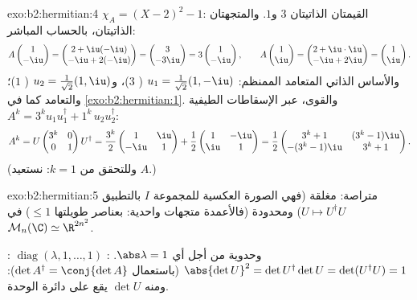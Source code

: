 \begin{solution}{exo:b2:hermitian:4}
$\chi_A = (X-2)^2 - 1$: القيمتان الذاتيتان $3$ و$1$. والمتجهتان الذاتيتان، بالحساب
المباشر:
\[
A\begin{pmatrix}1\\ -\iu\end{pmatrix}
= \begin{pmatrix} 2 + \iu(-\iu)\\ -\iu + 2(-\iu)\end{pmatrix}
= \begin{pmatrix} 3\\ -3\iu \end{pmatrix}
= 3\begin{pmatrix}1\\ -\iu\end{pmatrix},
\qquad
A\begin{pmatrix}1\\ \iu\end{pmatrix}
= \begin{pmatrix} 2 + \iu\cdot\iu\\ -\iu + 2\iu\end{pmatrix}
= \begin{pmatrix}1\\ \iu\end{pmatrix}.
\]
والأساس الذاتي المتعامد الممنظم: $u_1 = \frac{1}{\sqrt2}(1, -\iu)$
( $3$)، و$u_2 = \frac{1}{\sqrt2}(1, \iu)$ (
$1$)؛ والتعامد كما في \cref{exo:b2:hermitian:1}. والقوى، عبر
الإسقاطات الطيفية $A^k = 3^k u_1u_1^\dagger + 1^k\,
u_2u_2^\dagger$:
\[
A^k = U\begin{pmatrix} 3^k & 0\\ 0 & 1\end{pmatrix}U^\dagger
= \frac{3^k}{2}\begin{pmatrix} 1 & \iu\\ -\iu & 1\end{pmatrix}
+ \frac{1}{2}\begin{pmatrix} 1 & -\iu\\ \iu & 1\end{pmatrix}
= \frac12\begin{pmatrix}
3^k + 1 & (3^k - 1)\iu\\
-(3^k-1)\iu & 3^k + 1
\end{pmatrix}.
\]
(وللتحقق من $k = 1$: نستعيد $A$.)
\end{solution}

\begin{solution}{exo:b2:hermitian:5}
متراصة: مغلقة (فهي الصورة العكسية للمجموعة $I$ بالتطبيق  $U \mapsto
U^\dagger U$) ومحدودة (فالأعمدة متجهات واحدية: بعناصر
طويلتها $\leq 1$) في $\mathcal{M}_n(\C) \simeq \R^{2n^2}$.

: $\operatorname{diag}(\lambda, 1, \dots, 1)$ وحدوية
من أجل أي $\abs\lambda = 1$. : $\abs{\det U}^2 = \det
U^\dagger \det U = \det(U^\dagger U) = 1$ (باستعمال $\det A^\dagger =
\conj{\det A}$): ومنه $\det U$ يقع على دائرة الوحدة.
\end{solution}

